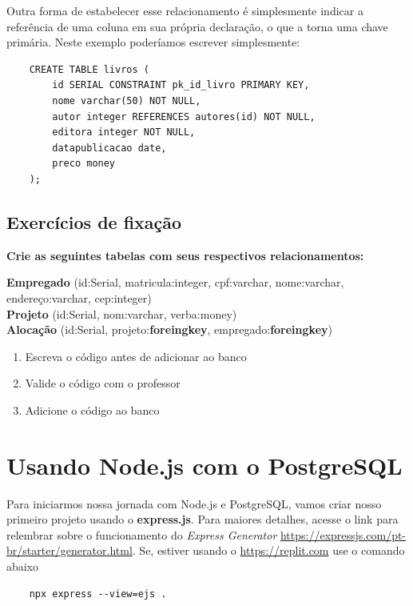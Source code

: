 Outra forma de estabelecer esse relacionamento é simplesmente indicar a referência de uma coluna em sua própria declaração, o que a torna uma chave primária. Neste exemplo poderíamos escrever simplesmente:

\begin{verbatim}
	CREATE TABLE livros (
		id SERIAL CONSTRAINT pk_id_livro PRIMARY KEY,
		nome varchar(50) NOT NULL,
		autor integer REFERENCES autores(id) NOT NULL,
		editora integer NOT NULL,
		datapublicacao date,
		preco money
	);
\end{verbatim}

\subsection{Exercícios de fixação}
\noindent
\textbf{Crie as seguintes tabelas com seus respectivos relacionamentos:}

\noindent
\textbf{Empregado} (id:Serial, matricula:integer, cpf:varchar, nome:varchar, endereço:varchar, cep:integer) \\
\textbf{Projeto} (id:Serial, nom:varchar, verba:money) \\
\textbf{Alocação} (id:Serial, projeto:\textbf{foreingkey}, empregado:\textbf{foreingkey})

\begin{enumerate}
	\item Escreva o código antes de adicionar ao banco
	\item Valide o código com o professor 
	\item Adicione o código ao banco
\end{enumerate}

\section{Usando Node.js com o PostgreSQL}

Para iniciarmos nossa jornada com Node.js e PostgreSQL, vamos criar nosso primeiro projeto usando o \textbf{express.js}. Para maiores detalhes, acesse o link para relembrar sobre o funcionamento do \textit{Express Generator} \url{https://expressjs.com/pt-br/starter/generator.html}. Se, estiver usando o \url{https://replit.com} use o comando abaixo

\begin{verbatim}
	npx express --view=ejs .	
\end{verbatim}


